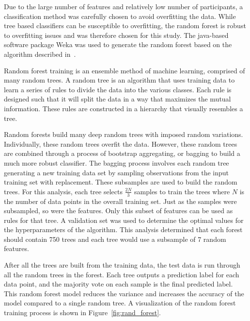 \documentclass[10pt,twocolumn,conference]{IEEEtran}
\begin{document}
Due to the large number of features and relatively low number of participants, a classification method was carefully chosen to avoid overfitting the data.
While tree based classifiers can be susceptible to overfitting, the random forest is robust to overfitting issues and was therefore chosen for this study.
The java-based software package Weka was used to generate the random forest based on the algorithm described in~\cite{Breiman2001}.

Random forest training is an ensemble method of machine learning, comprised of many random trees.
A random tree is an algorithm that uses training data to learn a series of rules to divide the data into the various classes.
Each rule is designed such that it will split the data in a way that maximizes the mutual information.
These rules are constructed in a hierarchy that visually resembles a tree.



Random forests build many deep random trees with imposed random variations.
Individually, these random trees overfit the data.
However, these random trees are combined through a process of bootstrap aggregating, or bagging to build a much more robust classifier.
The bagging process involves each random tree generating a new training data set by sampling observations from the input training set with replacement.
These subsamples are used to build the random trees.
For this analysis, each tree selects $\frac{2N}{3}$ samples to train the trees where $N$ is the number of data points in the overall training set.
Just as the samples were subsampled, so were the features.
Only this subset of features can be used as rules for that tree.
A validation set was used to determine the optimal values for the hyperparameters of the algorithm.
This analysis determined that each forest should contain 750 trees and each tree would use a subsample of 7 random features.

After all the trees are built from the training data, the test data is run through all the random trees in the forest.
Each tree outputs a prediction label for each data point, and the majority vote on each sample is the final predicted label.
This random forest model reduces the variance and increases the accuracy of the model compared to a single random tree.
A visualization of the random forest training process is shown in Figure~\ref{fig:rand_forest}.
\end{document}
